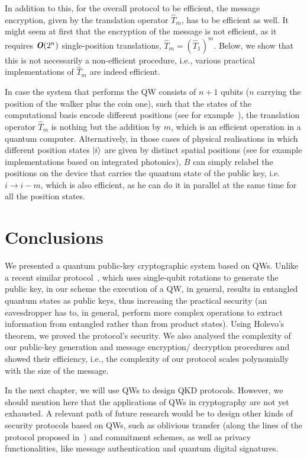 In addition to this, for the overall protocol to be efficient, the message encryption, given by the translation operator  $\hat{T}_m$, has to be efficient as well. It might seem at first that the encryption of the message is not efficient, as it requires $\textbf{\textit{O}}(2^n)$ single-position translations, $\hat{T}_m=(\hat{T}_1)^m$. Below, we show that this is not necessarily a non-efficient procedure, i.e., various practical implementations of $\hat{T}_m$ are indeed efficient.

In case the system that performs the QW consists of $n+1$ qubits ($n$ carrying the position of the walker plus the coin one), such that the states of the computational basis encode different positions (see for example~\cite{rya:laf:boi;laf:05}), the translation operator $\hat{T}_m$ is nothing but the addition by $m$, which is an efficient operation in a quantum computer.
Alternatively, in those cases of physical realisations in which different position states $| i \rangle$ are given by distinct spatial positions (see for example implementations based on integrated photonics\cite{san:etal:12}), $B$ can simply relabel the positions on the device that carries the quantum state of the public key, i.e. $i \rightarrow i-m$, which is also efficient, as he can do it in parallel at the same time for all the position states.

\section{Conclusions}
\label{sec:conclusions}
We presented a quantum public-key cryptographic system based on QWs. Unlike a recent similar protocol~\cite{nik:08}, which uses single-qubit rotations to generate the public key, in our scheme the execution of a QW, in general, results in entangled quantum states as public keys, thus increasing the practical security (an eavesdropper has to, in general, perform more complex operations to extract information from entangled rather than from product states). Using Holevo's theorem, we proved the protocol's security. We also analysed the complexity of our public-key generation and message encryption/ decryption procedures and showed their efficiency, i.e., the complexity of our protocol scales polynomially with the size of the message.

In the next chapter, we will use QWs to design QKD protocols. However, we should mention here that the applications of QWs in cryptography are not yet exhausted. A relevant path of future research would be to design other kinds of security protocols based on QWs, such as oblivious transfer (along the lines of the protocol proposed in~\cite{pmat:npaunkovic:jrodr:asouto:14}) and commitment schemes, as well as privacy functionalities, like message authentication and quantum digital signatures.


%
%
%
%
